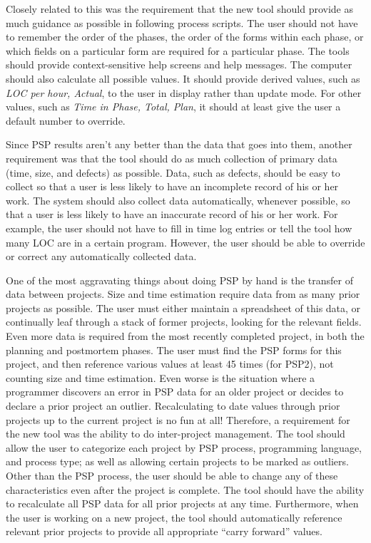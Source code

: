 Closely related to this was the requirement that the new tool should
provide as much guidance as possible in following process scripts.  The
user should not have to remember the order of the phases, the order of the
forms within each phase, or which fields on a particular form are required
for a particular phase. The tools should provide context-sensitive help
screens and help messages.  The computer should also calculate all possible
values.  It should provide derived values, such as {\it LOC per hour,
  Actual}, to the user in display rather than update mode.  For other
values, such as {\it Time in Phase, Total, Plan}, it should at least give
the user a default number to override.

Since PSP results aren't any better than the data that goes into them,
another requirement was that the tool should do as much collection of
primary data (time, size, and defects) as possible. Data, such as defects,
should be easy to collect so that a user is less likely to have an
incomplete record of his or her work.  The system should also collect data
automatically, whenever possible, so that a user is less likely to have an
inaccurate record of his or her work.  For example, the user should not
have to fill in time log entries or tell the tool how many LOC are in a
certain program.  However, the user should be able to override or correct
any automatically collected data.

One of the most aggravating things about doing PSP by hand is the transfer
of data between projects.  Size and time estimation require data from as
many prior projects as possible.  The user must either maintain a
spreadsheet of this data, or continually leaf through a stack of former
projects, looking for the relevant fields.  Even more data is required from
the most recently completed project, in both the planning and postmortem
phases.  The user must find the PSP forms for this project, and then
reference various values at least 45 times (for PSP2), not counting size
and time estimation.  Even worse is the situation where a programmer
discovers an error in PSP data for an older project or decides to declare a
prior project an outlier.  Recalculating to date values through prior
projects up to the current project is no fun at all!  Therefore, a
requirement for the new tool was the ability to do inter-project
management.  The tool should allow the user to categorize each project by
PSP process, programming language, and process type; as well as allowing
certain projects to be marked as outliers.  Other than the PSP process, the
user should be able to change any of these characteristics even after the
project is complete.  The tool should have the ability to recalculate all
PSP data for all prior projects at any time.  Furthermore, when the user is
working on a new project, the tool should automatically reference relevant
prior projects to provide all appropriate ``carry forward'' values.

